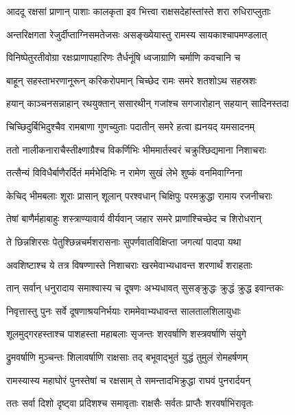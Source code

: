 \twolineshloka
{आददू रक्षसां प्राणान् पाशाः कालकृता इव}
{भित्त्वा राक्षसदेहांस्तांस्ते शरा रुधिराप्लुताः} %

\twolineshloka
{अन्तरिक्षगता रेजुर्दीप्ताग्निसमतेजसः}
{असङ्ख्येयास्तु रामस्य सायकाश्चापमण्डलात्} %

\twolineshloka
{विनिष्पेतुरतीवोग्रा रक्षःप्राणापहारिणः}
{तैर्धनूंषि ध्वजाग्राणि चर्माणि कवचानि च} %

\twolineshloka
{बाहून् सहस्ताभरणानूरून् करिकरोपमान्}
{चिच्छेद रामः समरे शतशोऽथ सहस्रशः} %

\twolineshloka
{हयान् काञ्चनसन्नाहान् रथयुक्तान् ससारथीन्}
{गजांश्च सगजारोहान् सहयान् सादिनस्तदा} %

\twolineshloka
{चिच्छिदुर्बिभिदुश्चैव रामबाणा गुणच्युताः}
{पदातीन् समरे हत्वा ह्यनयद् यमसादनम्} %

\twolineshloka
{ततो नालीकनाराचैस्तीक्ष्णाग्रैश्च विकर्णिभिः}
{भीममार्तस्वरं चक्रुश्छिद्यमाना निशाचराः} %

\twolineshloka
{तत्सैन्यं विविधैर्बाणैरर्दितं मर्मभेदिभिः}
{न रामेण सुखं लेभे शुष्कं वनमिवाग्निना} %

\twolineshloka
{केचिद् भीमबलाः शूराः प्रासान् शूलान् परश्वधान्}
{चिक्षिपुः परमक्रुद्धा रामाय रजनीचराः} %

\twolineshloka
{तेषां बाणैर्महाबाहुः शस्त्राण्यावार्य वीर्यवान्}
{जहार समरे प्राणांश्चिच्छेद च शिरोधरान्} %

\twolineshloka
{ते छिन्नशिरसः पेतुश्छिन्नचर्मशरासनाः}
{सुपर्णवातविक्षिप्ता जगत्यां पादपा यथा} %

\twolineshloka
{अवशिष्टाश्च ये तत्र विषण्णास्ते निशाचराः}
{खरमेवाभ्यधावन्त शरणार्थं शराहताः} %

\twolineshloka
{तान् सर्वान् धनुरादाय समाश्वास्य च दूषणः}
{अभ्यधावत् सुसङ्क्रुद्धः क्रुद्धं क्रुद्ध इवान्तकः} %

\twolineshloka
{निवृत्तास्तु पुनः सर्वे दूषणाश्रयनिर्भयाः}
{राममेवाभ्यधावन्त सालतालशिलायुधाः} %

\twolineshloka
{शूलमुद्गरहस्ताश्च पाशहस्ता महाबलाः}
{सृजन्तः शरवर्षाणि शस्त्रवर्षाणि संयुगे} %

\twolineshloka
{द्रुमवर्षाणि मुञ्चन्तः शिलावर्षाणि राक्षसाः}
{तद् बभूवाद्भुतं युद्धं तुमुलं रोमहर्षणम्} %

\twolineshloka
{रामस्यास्य महाघोरं पुनस्तेषां च रक्षसाम्}
{ते समन्तादभिक्रुद्धा राघवं पुनरार्दयन्} %

\twolineshloka
{ततः सर्वा दिशो दृष्ट्वा प्रदिशश्च समावृताः}
{राक्षसैः सर्वतः प्राप्तैः शरवर्षाभिरावृतः} %

